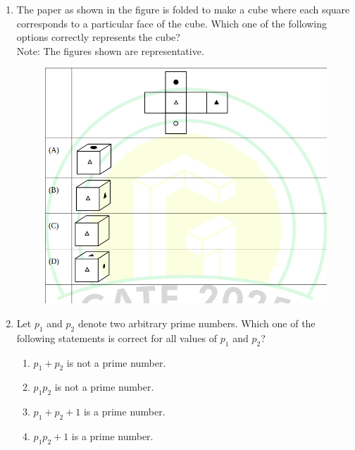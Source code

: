 \documentclass[journal]{IEEEtran}
\theoremstyle{remark}
\begin{document}
\begin{enumerate}
\item The paper as shown in the figure is folded to make a cube where each square corresponds to a particular face of the cube. Which one of the following options correctly represents the cube? \hfill{} \\
Note: The figures shown are representative.
\begin{figure}[H]
    \centering
    \includegraphics[width=0.7\columnwidth]{figs/Q.4.png} 
    \caption{}
    \label{fig:placeholder}
\end{figure}


\item Let $p_{1}$ and $p_{2}$ denote two arbitrary prime numbers. Which one of the following statements is correct for all values of $p_{1}$ and $p_{2}$? \hfill{}
\begin{multicols}{2}
\begin{enumerate}
\item $p_{1}+p_{2}$ is not a prime number.
\item $p_{1}p_{2}$ is not a prime number.
\item $p_{1}+p_{2}+1$ is a prime number.
\item $p_{1}p_{2}+1$ is a prime number.
\end{enumerate}
\end{multicols}
\end{enumerate}
\end{document}
